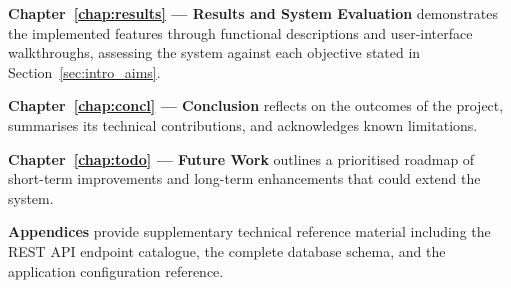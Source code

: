 \textbf{Chapter~\ref{chap:results} --- Results and System Evaluation} demonstrates the
implemented features through functional descriptions and user-interface walkthroughs,
assessing the system against each objective stated in Section~\ref{sec:intro_aims}.

\textbf{Chapter~\ref{chap:concl} --- Conclusion} reflects on the outcomes of the
project, summarises its technical contributions, and acknowledges known limitations.

\textbf{Chapter~\ref{chap:todo} --- Future Work} outlines a prioritised roadmap of
short-term improvements and long-term enhancements that could extend the system.

\textbf{Appendices} provide supplementary technical reference material including the
REST API endpoint catalogue, the complete database schema, and the application
configuration reference.

